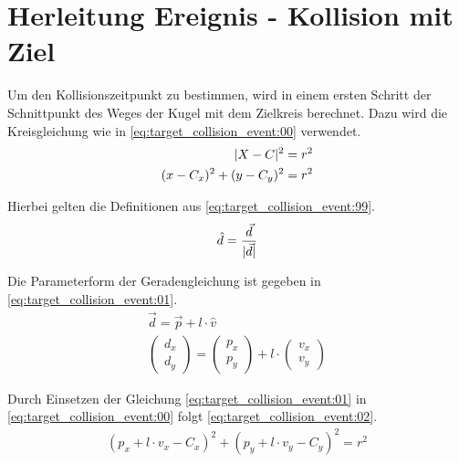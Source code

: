 \section{Herleitung Ereignis - Kollision mit Ziel}\label{anhang:herleitung:event:targetCollision}
Um den Kollisionszeitpunkt zu bestimmen, wird in einem ersten Schritt der Schnittpunkt des Weges der Kugel mit
dem Zielkreis berechnet. Dazu wird die Kreisgleichung wie in \ref{eq:target_collision_event:00} verwendet.
\begin{align}
    \lvert X - C \rvert^2 = r^2\\
    (x - C_x)^2 + (y - C_y)^2 = r^2\label{eq:target_collision_event:00}
\end{align}

Hierbei gelten die Definitionen aus \ref{eq:target_collision_event:99}.
\begin{align}
    \hat{d} = \frac{\vec{d}}{\lvert \vec{d} \rvert}\label{eq:target_collision_event:99}
\end{align}

Die Parameterform der Geradengleichung ist gegeben in \ref{eq:target_collision_event:01}.
\begin{align}
    \vec{d} = \vec{p} + l \cdot \hat{v}\\
    \begin{pmatrix}d_{x}\\d_{y}\end{pmatrix} = \begin{pmatrix}p_{x}\\p_{y}\end{pmatrix} + l \cdot \begin{pmatrix}v_{x}\\v_{y}\end{pmatrix}\label{eq:target_collision_event:01}
\end{align}

Durch Einsetzen der Gleichung \ref{eq:target_collision_event:01} in \ref{eq:target_collision_event:00} folgt \ref{eq:target_collision_event:02}.
\begin{align}
    (p_x + l \cdot v_x - C_x)^2 + (p_y + l \cdot v_y - C_y)^2 = r^2\label{eq:target_collision_event:02}
\end{align}

